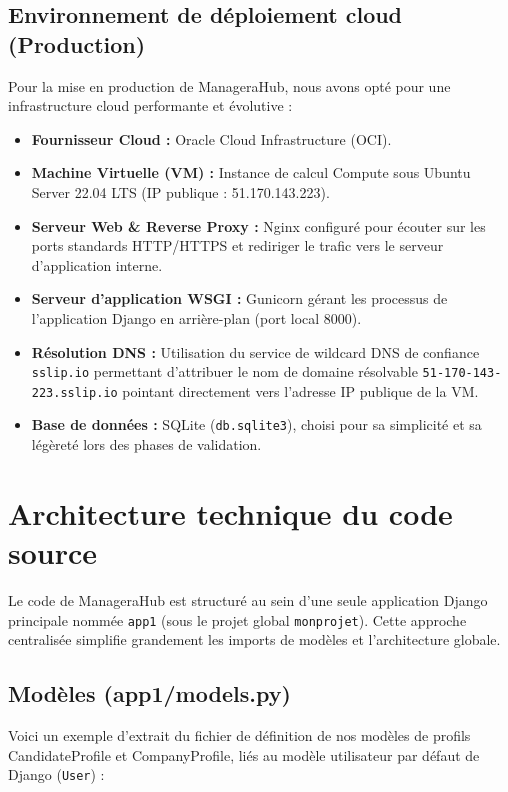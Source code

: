 \subsection{Environnement de déploiement cloud (Production)}
Pour la mise en production de ManageraHub, nous avons opté pour une infrastructure cloud performante et évolutive :
\begin{itemize}
    \item \textbf{Fournisseur Cloud :} Oracle Cloud Infrastructure (OCI).
    \item \textbf{Machine Virtuelle (VM) :} Instance de calcul Compute sous Ubuntu Server 22.04 LTS (IP publique : 51.170.143.223).
    \item \textbf{Serveur Web \& Reverse Proxy :} Nginx configuré pour écouter sur les ports standards HTTP/HTTPS et rediriger le trafic vers le serveur d'application interne.
    \item \textbf{Serveur d'application WSGI :} Gunicorn gérant les processus de l'application Django en arrière-plan (port local 8000).
    \item \textbf{Résolution DNS :} Utilisation du service de wildcard DNS de confiance \texttt{sslip.io} permettant d'attribuer le nom de domaine résolvable \texttt{51-170-143-223.sslip.io} pointant directement vers l'adresse IP publique de la VM.
    \item \textbf{Base de données :} SQLite (\texttt{db.sqlite3}), choisi pour sa simplicité et sa légèreté lors des phases de validation.
\end{itemize}

\section{Architecture technique du code source}
Le code de ManageraHub est structuré au sein d'une seule application Django principale nommée \texttt{app1} (sous le projet global \texttt{monprojet}). Cette approche centralisée simplifie grandement les imports de modèles et l'architecture globale.

\subsection{Modèles (app1/models.py)}
Voici un exemple d'extrait du fichier de définition de nos modèles de profils CandidateProfile et CompanyProfile, liés au modèle utilisateur par défaut de Django (\texttt{User}) :

